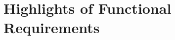 \documentclass[]{article}
\begin{document}
%
%
%

\section{Highlights of Functional Requirements}
\label{sec:functional_requirements}
\end{document}
